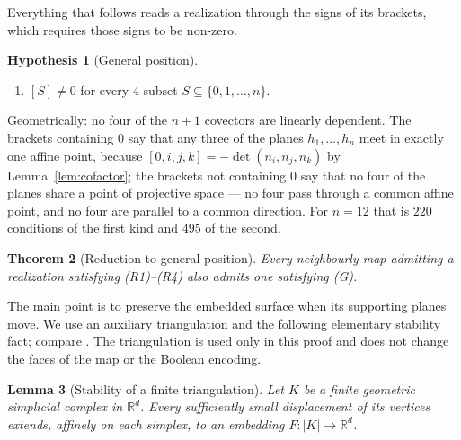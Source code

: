 \documentclass[11pt,reqno]{amsart}
\theoremstyle{plain}
\newtheorem{theorem}{Theorem}[section]
\newtheorem{lemma}[theorem]{Lemma}
\theoremstyle{definition}
\newtheorem{hypothesis}[theorem]{Hypothesis}
\newcommand{\RR}{\mathbb{R}}
\newcommand{\bra}[1]{[#1]}
\DeclareMathOperator{\dett}{det}
\begin{document}
Everything that follows reads a realization through the signs of its brackets, which requires those
signs to be non-zero.

\begin{hypothesis}[General position]\label{hyp:G}\leavevmode
\begin{enumerate}[label=\textup{(G)},leftmargin=3.2em]
\item $\bra{S}\ne0$ for every $4$-subset $S\subseteq\{0,1,\dots,n\}$.
\end{enumerate}
\end{hypothesis}

Geometrically: no four of the $n+1$ covectors are linearly dependent. The brackets containing $0$ say
that any three of the planes $h_1,\dots,h_n$ meet in exactly one affine point, because
$\bra{0,i,j,k}=-\dett(n_i,n_j,n_k)$ by Lemma~\ref{lem:cofactor}; the brackets not containing $0$ say
that no four of the planes share a point of projective space --- no four pass through a common affine
point, and no four are parallel to a common direction. For $n=12$ that is $220$ conditions of the
first kind and $495$ of the second.

\begin{theorem}[Reduction to general position]\label{thm:genpos}
Every neighbourly map admitting a realization satisfying \textup{(R1)}--\textup{(R4)} also admits
one satisfying \textup{(G)}.
\end{theorem}

The main point is to preserve the embedded surface when its supporting planes move. We use an
auxiliary triangulation and the following elementary stability fact; compare
\cite[Section 2, Lemmas 2.1--2.2]{Lazarus2020}. The triangulation is used only in this proof and
does not change the faces of the map or the Boolean encoding.

\begin{lemma}[Stability of a finite triangulation]\label{lem:plstability}
Let $K$ be a finite geometric simplicial complex in $\RR^d$. Every sufficiently small displacement
of its vertices extends, affinely on each simplex, to an embedding $F\colon |K|\to\RR^d$.
\end{lemma}
\end{document}
